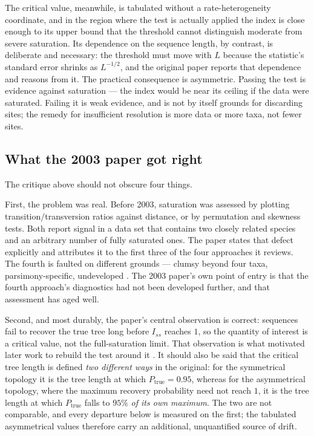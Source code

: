\documentclass[11pt]{article}
\newcommand{\Iss}{I_{ss}}
\theoremstyle{definition}
\theoremstyle{remark}
\begin{document}
The critical value, meanwhile, is tabulated without a rate-heterogeneity
coordinate, and in the region where the test is actually applied the index is
close enough to its upper bound that the threshold cannot distinguish moderate
from severe saturation. Its dependence on the sequence length, by contrast, is
deliberate and necessary: the threshold must move with $L$ because the
statistic's standard error shrinks as $L^{-1/2}$, and the original paper
reports that dependence and reasons from it. The practical consequence is
asymmetric. Passing the test is evidence against saturation --- the index
would be near its ceiling if the data were saturated. Failing it is weak
evidence, and is not by itself grounds for discarding sites; the remedy for
insufficient resolution is more data or more taxa, not fewer sites.

\subsection{What the 2003 paper got right}
\label{sec:right}

The critique above should not obscure four things.

First, the problem was real. Before 2003, saturation was assessed by plotting
transition\slash transversion ratios against distance, or by permutation and
skewness tests. Both report signal in a data set that contains two closely
related species and an arbitrary number of fully saturated ones. The paper
states that defect explicitly and attributes it to the first three of the four
approaches it reviews. The fourth is faulted on different grounds --- clumsy
beyond four taxa, parsimony-specific, undeveloped
\citep{steel1993confidence,steel1995frequency}. The 2003 paper's own point of
entry is that the fourth approach's diagnostics had not been developed
further, and that assessment has aged well.

Second, and most durably, the paper's central observation is correct: sequences
fail to recover the true tree long before $\Iss$ reaches $1$, so the quantity of
interest is a critical value, not the full-saturation limit. That observation is
what motivated later work to rebuild the test around it
\citep{duchene2022saturation}. It should also be said that the critical tree
length is defined \emph{two different ways} in the original: for the symmetrical
topology it is the tree length at which $P_{\mathrm{true}}=0.95$, whereas for the
asymmetrical topology, where the maximum recovery probability need not reach
$1$, it is the tree length at which $P_{\mathrm{true}}$ falls to $95\%$ \emph{of
its own maximum}. The two are not comparable, and every departure below is
measured on the first; the tabulated asymmetrical values therefore carry an
additional, unquantified source of drift.
\end{document}
